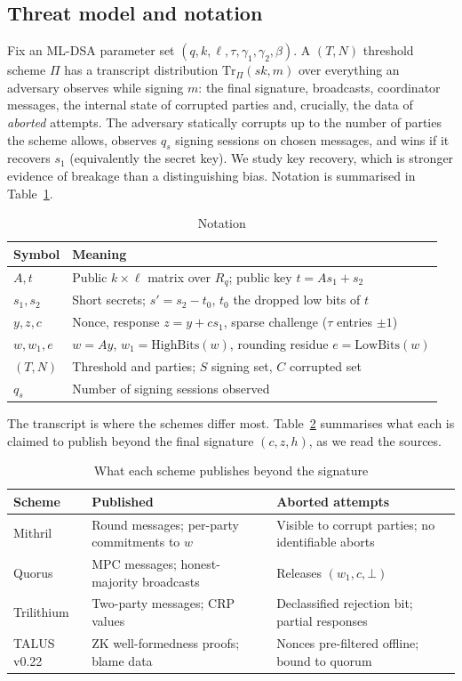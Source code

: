 \documentclass[10pt,conference,a4paper]{IEEEtran}
\newcommand{\HB}{\mathrm{HighBits}}
\newcommand{\LB}{\mathrm{LowBits}}
\begin{document}
\subsection{Threat model and notation}
Fix an ML-DSA parameter set $(q,k,\ell,\tau,\gamma_1,\gamma_2,\beta)$. A $(T,N)$ threshold scheme $\Pi$ has a transcript
distribution $\mathrm{Tr}_\Pi(\mathit{sk},m)$ over everything an adversary observes while signing $m$: the final
signature, broadcasts, coordinator messages, the internal state of corrupted parties and, crucially, the data of
\emph{aborted} attempts. The adversary statically corrupts up to the number of parties the scheme allows, observes $q_s$
signing sessions on chosen messages, and wins if it recovers $s_1$ (equivalently the secret key). We study key recovery,
which is stronger evidence of breakage than a distinguishing bias. Notation is summarised in Table~\ref{tab:notation}.

\begin{table}[t]
\caption{Notation}\label{tab:notation}
\centering\footnotesize
\begin{tabularx}{\columnwidth}{@{}lX@{}}
\toprule
Symbol & Meaning\\
\midrule
$A,t$ & Public $k\times\ell$ matrix over $R_q$; public key $t=As_1+s_2$\\
$s_1,s_2$ & Short secrets; $s'=s_2-t_0$, $t_0$ the dropped low bits of $t$\\
$y,z,c$ & Nonce, response $z=y+cs_1$, sparse challenge ($\tau$ entries $\pm1$)\\
$w,w_1,e$ & $w=Ay$, $w_1=\HB(w)$, rounding residue $e=\LB(w)$\\
$(T,N)$ & Threshold and parties; $S$ signing set, $C$ corrupted set\\
$q_s$ & Number of signing sessions observed\\
\bottomrule
\end{tabularx}
\end{table}

The transcript is where the schemes differ most. Table~\ref{tab:transcript} summarises what each is claimed to publish
beyond the final signature $(c,z,h)$, as we read the sources.

\begin{table}[t]
\caption{What each scheme publishes beyond the signature}\label{tab:transcript}
\centering\footnotesize
\begin{tabularx}{\columnwidth}{@{}lXX@{}}
\toprule
Scheme & Published & Aborted attempts\\
\midrule
Mithril & Round messages; per-party commitments to $w$ & Visible to corrupt parties; no identifiable aborts\\
Quorus & MPC messages; honest-majority broadcasts & Releases $(w_1,c,\bot)$\\
Trilithium & Two-party messages; CRP values & Declassified rejection bit; partial responses\\
TALUS v0.22 & ZK well-formedness proofs; blame data & Nonces pre-filtered offline; bound to quorum\\
\bottomrule
\end{tabularx}
\end{table}
\end{document}
